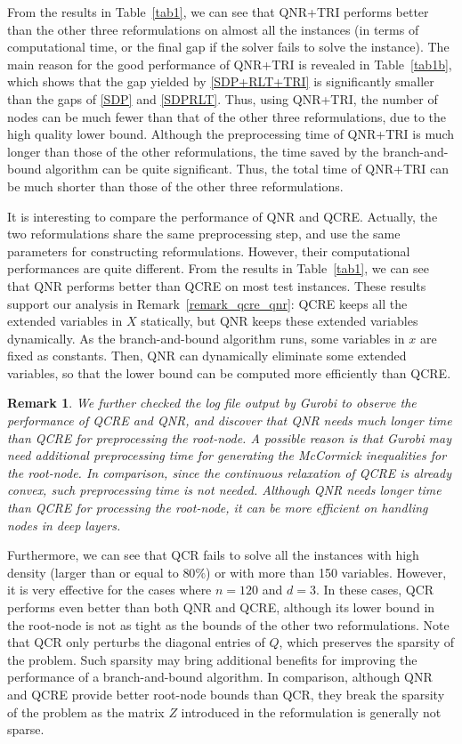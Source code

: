 \documentclass[pdflatex,sn-mathphys-num]{sn-jnl}%
\theoremstyle{thmstyleone}%
\theoremstyle{thmstyletwo}%
\newtheorem{remark}{Remark}%
\theoremstyle{thmstylethree}%
\begin{document}
From the results in Table~\ref{tab1}, we can see that QNR+TRI performs better than the other three reformulations on almost all the instances (in terms of computational time, or the final gap if the solver fails to solve the instance). The main reason for the good performance of QNR+TRI is revealed in Table~\ref{tab1b}, which shows that the gap yielded by \eqref{SDP+RLT+TRI} is significantly smaller than the gaps of \eqref{SDP} and \eqref{SDPRLT}. Thus, using QNR+TRI, the number of nodes can be much fewer than that of the other three reformulations, due to the high quality lower bound. Although the preprocessing time of QNR+TRI is much longer than those of the other reformulations, the time saved by the branch-and-bound algorithm can be quite significant. Thus, the total time of QNR+TRI can be much shorter than those of the other three reformulations.


It is interesting to compare the performance of QNR and QCRE. Actually, the two reformulations share the same preprocessing step, and use the same parameters for constructing reformulations. However, their computational performances are quite different. From the results in Table~\ref{tab1}, we can see that QNR performs better than QCRE on most test instances. These results support our analysis in Remark~\ref{remark_qcre_qnr}: QCRE keeps all the extended variables in $X$ statically, but QNR keeps these extended variables dynamically. As the branch-and-bound algorithm runs, some variables in $x$ are fixed as constants. Then, QNR can dynamically eliminate some extended variables, so that the lower bound can be computed more efficiently than QCRE.

\begin{remark}\label{remark_qnr_qcre_root}
	We further checked the log file output by Gurobi to observe the performance of QCRE and QNR, and discover that QNR needs much longer time than QCRE for preprocessing the root-node. A possible reason is that Gurobi may need additional preprocessing time for generating the McCormick inequalities for the root-node. In comparison, since the continuous relaxation of QCRE is already convex, such preprocessing time is not needed. Although QNR needs longer time than QCRE for processing the root-node, it can be more efficient on handling nodes in deep layers.
\end{remark}

Furthermore, we can see that QCR fails to solve all the instances with high density (larger than or equal to $80\%$) or with more than 150 variables. However, it is very effective for the cases where $n=120$ and $d=3$. In these cases, QCR performs even better than both QNR and QCRE, although its lower bound in the root-node is not as tight as the bounds of the other two reformulations. Note that QCR only perturbs the diagonal entries of $Q$, which preserves the sparsity of the problem. Such sparsity may bring additional benefits for improving the performance of a branch-and-bound algorithm. In comparison, although QNR and QCRE provide better root-node bounds than QCR, they break the sparsity of the problem as the matrix $Z$ introduced in the reformulation is generally not sparse.
\end{document}

